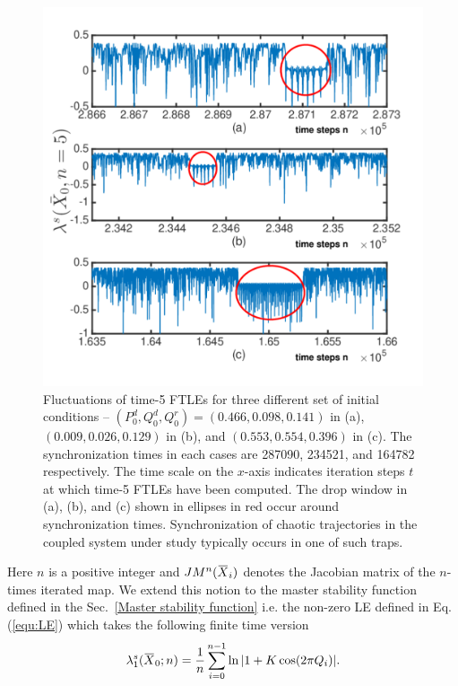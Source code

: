 \documentclass[reprint,amsmath,amssymb,aps,pre]{revtex4-1}
\newcommand{\overbar}[1]{\mkern 1.5mu\overline{\mkern-1.5mu#1\mkern-1.5mu}\mkern 1.5mu}
\begin{document}
\begin{figure}[t!]
	\includegraphics[scale=0.41]{FTLE_plots}
	\caption{\label{fig:FTLE}\footnotesize Fluctuations of time-5 FTLEs for three different set of initial conditions -- $(P^d_0,Q^d_0,Q^r_0) = (0.466,0.098,0.141)$ in (a),  $(0.009,0.026,0.129)$ in (b), and $(0.553,0.554,0.396)$ in (c). The synchronization times in each cases are 287090, 234521, and 164782 respectively. The time scale on the $x$-axis indicates iteration steps $t$ at which time-5 FTLEs have been computed. The drop window in (a), (b), and (c) shown in ellipses in red occur around synchronization times. Synchronization of chaotic trajectories in the coupled system under study typically occurs in one of such traps.}
\end{figure}

Here $n$ is a positive integer and $JM^n(\overbar{X}_i)$ denotes the Jacobian matrix of the $n$-times iterated map. We extend this notion to the master stability function defined in the Sec.~\ref{Master stability function}  i.e.  the non-zero LE defined in Eq.(\ref{equ:LE}) 
which takes the following finite time version 
\begin{equation}
\lambda_1^s(\overbar{X}_0;n) = \frac{1}{n}\sum^{n-1}_{i=0}\ln|1 + K \cos (2\pi 
Q_i)|.
\end{equation}
\end{document}
